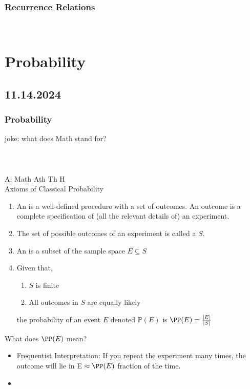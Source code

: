 \documentclass[11pt]{scrartcl}
\begin{document}
\subsubsection{Recurrence Relations}
\newline
\noindent
\Line
\\
\section{Probability}
\subsection{11.14.2024}
\subsubsection{Probability}
joke: what does Math stand for?
\newline
\\
\\
\\
\\
\noindent
A: Math Ath Th H
\\
Axioms of Classical Probability
\begin{enumerate}
    \item An  is a well-defined procedure with a set of outcomes.  An outcome is a complete specification of (all the relevant details of) an experiment.
    \item The set of possible outcomes of an experiment is called a  $S$. 
    \item An  is a subset of the sample space $E \subseteq S$
    \item Given that, \begin{enumerate}
        \item $S$ is finite
        \item All outcomes in $S$ are equally likely
    \end{enumerate}
    the probability of an event $E$ denoted $\mathbb{P}(E)$ is $\PP(E) = \frac{|E|}{|S|}$
\end{enumerate}

What does $\PP(E)$ mean? \begin{itemize}
    \item Frequentist Interpretation: If you repeat the experiment many times, the outcome will lie in E $\approx \PP(E)$ fraction of the time.
    \item
\end{itemize}
\newline
\noindent
\Line
\\
\end{document}

